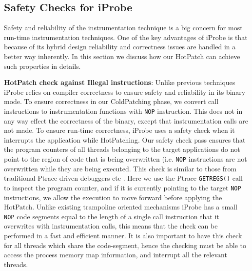 \subsection{Safety Checks for iProbe}
\label{sec:safety}

Safety and reliability of the instrumentation technique is a big concern for most run-time instrumentation techniques.
One of the key advantages of iProbe is that because of its hybrid design reliability and correctness issues are handled in a better way inherently.
In this section we discuss how our HotPatch can achieve such properties in details.

\indent \textbf{HotPatch check against Illegal instructions}: \quad
Unlike previous techniques iProbe relies on compiler correctness to ensure safety and reliability in its binary mode.
To ensure correctness in our ColdPatching phase, we convert call instructions to instrumentation functions with \texttt{NOP} instruction. 
This does not in any way effect the correctness of the binary, except that instrumentation calls are not made. 
To ensure run-time correctness, iProbe uses a safety check when it interrupts the application while HotPatching. 
Our safety check pass ensures that the program counters of all threads belonging to the target applications do not point to the region of code that is being overwritten (i.e. \texttt{NOP} instructions are not overwritten while they are being executed.
This check is similar to those from traditional Ptrace\cite{ptrace} driven debuggers etc \cite{kaho,livepatch}. 
Here we use the Ptrace \texttt{GETREGS()} call to inspect the program counter, and if it is currently pointing to the target \texttt{NOP} instructions, we allow the execution to move forward before applying the HotPatch. 
Unlike existing trampoline oriented mechanisms iProbe has a small \texttt{NOP} code segments equal to the length of a single call instruction that it overwrites with instrumentation calls, this means that the check can be performed in a fast and efficient manner. 
It is also important to have this check for all threads which share the code-segment, hence the checking must be able to access the process memory map information, and interrupt all the relevant threads.

